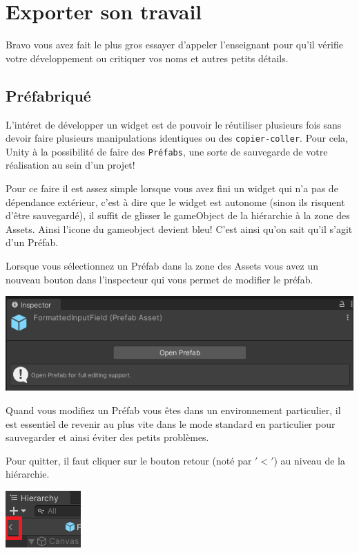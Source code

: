 \documentclass[a4paper,10pt]{article}
\newenvironment{info}%
{\begin{tcolorbox}[breakable,colback=green!5!white,colframe=green!75!black,title=Information]}%
{\end{tcolorbox}}
\newenvironment{attention}%
{\begin{tcolorbox}[breakable,colback=green!25!white,colframe=red!55!black,title=Attention]}%
{\end{tcolorbox}}
\begin{document}
\section{Exporter son travail}

Bravo vous avez fait le plus gros essayer d'appeler l'enseignant pour qu'il vérifie votre développement ou critiquer vos noms et autres petits détails.

\subsection{Préfabriqué}
L'intéret de développer un widget est de pouvoir le réutiliser plusieurs fois sans devoir faire plusieurs manipulations identiques ou des \texttt{copier-coller}. Pour cela, Unity à la possibilité de faire des \texttt{Préfabs}, une sorte de sauvegarde de votre réalisation au sein d'un projet!

Pour ce faire il est assez simple lorsque vous avez fini un widget qui n'a pas de dépendance extérieur, c'est à dire que le widget est autonome (sinon ils risquent d'être sauvegardé), il suffit de glisser le gameObject de la hiérarchie à la zone des Assets. Ainsi l'icone du gameobject devient bleu! C'est ainsi qu'on sait qu'il s'agit d'un Préfab.


\begin{info}
Lorsque vous sélectionnez un Préfab dans la zone des Assets vous avez un nouveau bouton dans l'inspecteur qui vous permet de modifier le préfab.
\begin{center}
	\includegraphics[width=0.5\linewidth]{rc/unity_set_ui_open_prefab}
\end{center}
\end{info}

\begin{attention}
Quand vous modifiez un Préfab vous êtes dans un environnement particulier, il est essentiel de revenir au plus vite dans le mode standard en particulier pour sauvegarder et ainsi éviter des petits problèmes. 

Pour quitter, il faut cliquer sur le bouton retour (noté par $'<'$) au niveau de la hiérarchie.
\begin{center}
	\includegraphics[width=0.3\linewidth]{rc/unity_set_ui_close_prefab}
\end{center}
\end{attention}
\end{document}
